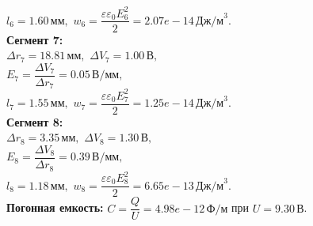 \documentclass{article}
\begin{document}
$l_{6} = 1.60\,\text{мм},$ $w_{6} = \dfrac{\varepsilon \varepsilon_0 E_{6}^2}2 = 2.07e-14\,\text{Дж/м}^3.$\\[1em]
\noindent \textbf{Сегмент 7:}\\
$\Delta r_{7} = 18.81\,\text{мм},$ $\Delta V_{7} = 1.00\,\text{В},$\\
$E_{7} = \dfrac{\Delta V_{7}}{\Delta r_{7}} = 0.05\,\text{В/мм},$\\
$l_{7} = 1.55\,\text{мм},$ $w_{7} = \dfrac{\varepsilon \varepsilon_0 E_{7}^2}2 = 1.25e-14\,\text{Дж/м}^3.$\\[1em]
\noindent \textbf{Сегмент 8:}\\
$\Delta r_{8} = 3.35\,\text{мм},$ $\Delta V_{8} = 1.30\,\text{В},$\\
$E_{8} = \dfrac{\Delta V_{8}}{\Delta r_{8}} = 0.39\,\text{В/мм},$\\
$l_{8} = 1.18\,\text{мм},$ $w_{8} = \dfrac{\varepsilon \varepsilon_0 E_{8}^2}2 = 6.65e-13\,\text{Дж/м}^3.$\\[1em]
\vspace{1em}
\noindent \textbf{Погонная емкость:} $C = \dfrac{Q}{U} = 4.98e-12\,\text{Ф/м}$ при $U = 9.30\,\text{В}$.
\end{document}
